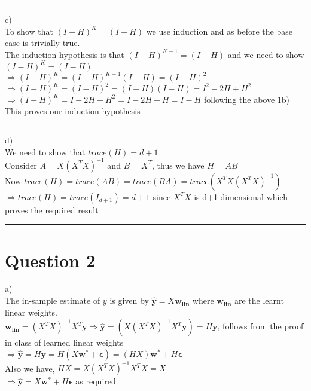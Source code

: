 \documentclass{article}
\begin{document}
\par\noindent\rule{\textwidth}{0.4pt}

c) \\ 

To show that $(I-H)^K=(I-H)$ we use induction and as before the base case is trivially true. \\ 
The induction hypothesis is that $(I-H)^{K-1}=(I-H)$ and we need to show $(I-H)^K=(I-H)$ \\ 
$\Rightarrow (I-H)^K = (I-H)^{K-1}(I-H) = (I-H)^2$ \\
$\Rightarrow (I-H)^K = (I-H)^2 = (I-H)(I-H) = I^2 - 2H + H^2$ \\ 
$\Rightarrow (I-H)^K = I - 2H + H^2 = I - 2H + H = I- H $ following the above 1b) 
\\ This proves our induction hypothesis

\par\noindent\rule{\textwidth}{0.4pt}

d) \\ 

We need to show that $trace(H) = d+1$ 
\\ 
Consider $A=X(X^TX)^{-1}$ and $B=X^T$, thus we have $H=AB$ \\ 
Now $trace(H) = trace(AB) = trace(BA) = trace(X^TX(X^TX)^{-1}) $ \\ 
$\Rightarrow trace(H)= trace(I_{d+1}) = d+1 $ since $X^TX$ is d+1 dimensional  which proves the required result

\par\noindent\rule{\textwidth}{0.4pt}

\section*{Question 2}

a) \\ 

The in-sample estimate of $y$ is given by $\bm{\hat{y}} = X\bm{w_{lin}}$ where $\bm{w_{lin}}$ are the learnt linear weights. \\
$\bm{w_{lin}} = (X^TX)^{-1}X^T\bm{y} \Rightarrow \bm{\hat{y}} = (X(X^TX)^{-1}X^T\bm{y}) = H\bm{y}$, follows from the proof in class of learned linear weights\\ 
$\Rightarrow \bm{\hat{y}} = H\bm{y} = H(X\bm{w^*} + \bm{\epsilon}) = (HX)\bm{w^*} + H\bm{\epsilon}$ \\ 
Also we have, $HX = X(X^TX)^{-1}X^TX = X$ \\ 
$\Rightarrow \bm{\hat{y}} = X\bm{w^*} + H\bm{\epsilon}$ as required \\ 
\end{document}
